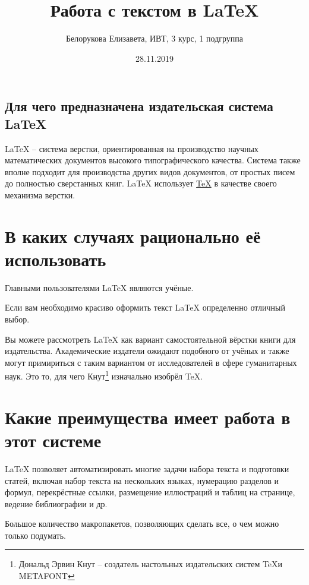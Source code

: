 \documentclass[a4paper,12pt]{article}
\author{Белорукова Елизавета, ИВТ, 3 курс, 1 подгруппа}
\title{Работа с текстом в \LaTeX{}}
\date{28.11.2019}
\begin{document}
 

\maketitle
\newpage
\begin{center}
\section{Для чего предназначена издательская система \LaTeX{}}
\end{center}

\large
\begin{flushright}
\LaTeX{} -- система верстки, ориентированная на производство научных математических документов высокого типографического качества. Система также вполне подходит для производства других видов документов, от простых писем до полностью сверстанных книг. \LaTeX{} использует \href{https://ru.wikipedia.org/wiki/TeX}{\TeX{}} в качестве своего механизма верстки.
\end{flushright}

\section{В каких случаях рационально её использовать}

Главными пользователями \LaTeX{} являются учёные.

Если вам необходимо красиво оформить текст \LaTeX{} определенно отличный выбор.

Вы можете рассмотреть \LaTeX{} как вариант самостоятельной вёрстки книги для издательства. Академические издатели ожидают подобного от учёных и также могут примириться с таким вариантом от исследователей в сфере гуманитарных наук. Это то, для чего Кнут\footnote{Дональд Эрвин Кнут -- создатель настольных издательских систем \TeX и METAFONT} изначально изобрёл \TeX{}.

\section{Какие преимущества имеет работа в этот системе}

\LaTeX{} позволяет автоматизировать многие задачи набора текста и подготовки статей, включая набор текста на нескольких языках, нумерацию разделов и формул, перекрёстные ссылки, размещение иллюстраций и таблиц на странице, ведение библиографии и др. 

Большое количество макропакетов, позволяющих сделать все, о чем можно только подумать.
\end{document}
